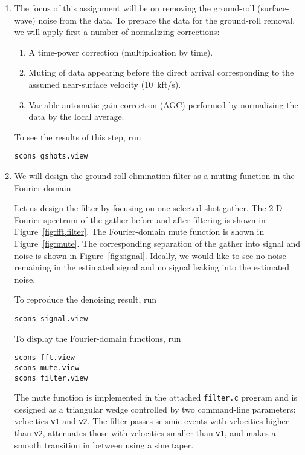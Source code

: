 \begin{enumerate}
\item The focus of this assignment will be on removing the ground-roll
  (surface-wave) noise from the data. To prepare the data for the
  ground-roll removal, we will apply first a number of normalizing corrections:
\begin{enumerate}
\item A time-power correction (multiplication by time).
\item Muting of data appearing before the direct arrival corresponding to the assumed near-surface velocity (10~kft/s).    
\item Variable automatic-gain correction (AGC) performed by normalizing the data by the local average.
\end{enumerate}
To see the results of this step, run
\begin{verbatim}
scons gshots.view
\end{verbatim}
\item We will design the ground-roll elimination filter as a muting function in the Fourier domain. 


Let us design the filter by focusing on one selected shot gather. The
2-D Fourier spectrum of the gather before and after filtering is shown
in Figure~\ref{fig:fft,filter}. The Fourier-domain mute function is
shown in Figure~\ref{fig:mute}. The corresponding separation of the gather into signal and noise is shown in Figure~\ref{fig:signal}. Ideally, we would like to see no noise remaining in the estimated signal and no signal leaking into the estimated noise.

To reproduce the denoising result, run
\begin{verbatim}
scons signal.view
\end{verbatim}
To display the Fourier-domain functions, run
\begin{verbatim}
scons fft.view
scons mute.view
scons filter.view
\end{verbatim}

The mute function is implemented in the attached \texttt{filter.c}
program and is designed as a triangular wedge controlled by two
command-line parameters: velocities \texttt{v1} and \texttt{v2}. The
filter passes seismic events with velocities higher than \texttt{v2},
attenuates those with velocities smaller than \texttt{v1}, and makes a
smooth transition in between using a sine taper. 


\end{enumerate}
